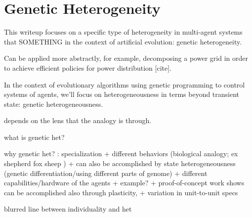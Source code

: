 \section{Genetic Heterogeneity}

This writeup focuses on a specific type of heterogeneity in multi-agent systems that SOMETHING in the context of artificial evolution: genetic heterogeneity.

Can be applied more abstractly, for example, decomposing a power grid in order to achieve efficient policies for power distribution [cite].

In the context of evolutionary algorithms using genetic programming to control systems of agents, we'll focus on heterogeneousness in terms beyond transient state: genetic heterogeneousness.

depends on the lens that the analogy is through.

what is genetic het?

why genetic het? : specialization
+ different behaviors (biological analogy; ex shepherd fox sheep \cite{potter2001heterogeneity} )
  + can also be accomplished by state heterogeneousness (genetic differentiation/using different parts of genome) \cite{ferrante2015evolution}
+ different capabilities/hardware of the agents \cite{mathews2012supervised}
  + example?
  + proof-of-concept work shows can be accomplished also through plasticity, \cite{tuci2008evolving}
  + variation in unit-to-unit specs \cite{pugh2007parallel} \cite{duarte2016evolution}

blurred line between individuality and het
